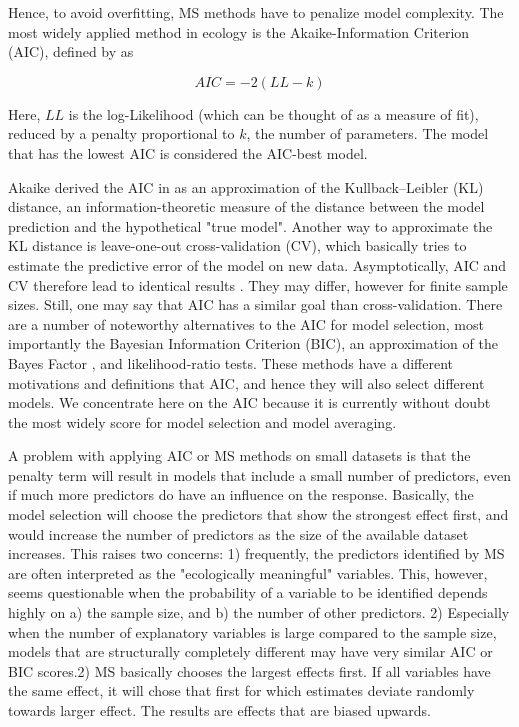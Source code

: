 \documentclass[5p]{elsarticle}
\begin{document}
Hence, to avoid overfitting, MS methods have to penalize model complexity. The most widely applied method in ecology is the Akaike-Information Criterion (AIC), defined by \citet{Akaike-NewLookAt-1974} as 

\begin{equation}
AIC = - 2 (LL - k) 
\label{eq: AIC}
\end{equation}

Here, $LL$ is the log-Likelihood (which can be thought of as a measure of fit), reduced by a penalty proportional to $k$, the number of parameters. The model that has the lowest AIC is considered the AIC-best model. 

Akaike derived the AIC in \citet{Akaike-NewLookAt-1974} as an approximation of the Kullback–Leibler (KL) distance, an information-theoretic measure of the distance between the model prediction and the hypothetical "true model". Another way to approximate the KL distance is leave-one-out cross-validation (CV), which basically tries to estimate the predictive error of the model on new data. Asymptotically, AIC and CV therefore lead to identical results \citep{Stone-AsymptoticEquivalenceChoice-1977}. They may differ, however for finite sample sizes. Still, one may say that AIC has a similar goal than cross-validation. There are a number of noteworthy alternatives to the AIC for model selection, most importantly the Bayesian Information Criterion (BIC), an approximation of the Bayes Factor \citep{Kass-BayesFactors-1995}, and likelihood-ratio tests. These methods have a different motivations and definitions that AIC, and hence they will also select different models. We concentrate here on the AIC because it is currently without doubt the most widely score for model selection and model averaging.

A problem with applying AIC or MS methods on small datasets is that the penalty term will result in models that include a small number of predictors, even if much more predictors do have an influence on the response. Basically, the model selection will choose the predictors that show the strongest effect first, and would increase the number of predictors as the size of the available dataset increases. This raises two concerns: 1) frequently, the predictors identified by MS are often interpreted as the "ecologically meaningful" variables. This, however, seems questionable when the probability of a variable to be identified depends highly on a) the sample size, and b) the number of other predictors. 2) Especially when the number of explanatory variables is large compared to the sample size, models that are structurally completely different may have very similar AIC or BIC scores.2) MS basically chooses the largest effects first. If all variables have the same effect, it will chose that first for which estimates deviate randomly towards larger effect. The results are effects that are biased upwards. 
\end{document}
